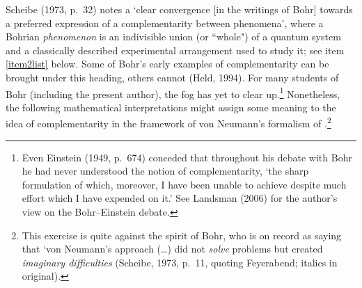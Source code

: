 \documentclass[12pt,titlepage]{article}
\begin{document}
Scheibe (1973, p.\ 32) notes a `clear convergence [in the writings of Bohr] towards a preferred expression of a complementarity between phenomena', where a Bohrian {\it phenomenon} is an indivisible union (or ``whole") of a quantum system and a classically described experimental arrangement used to study it; see item \ref{item2list} below. Some of Bohr's early examples of 
complementarity can be brought under this heading, others  cannot (Held, 1994). For many students of Bohr (including the present author), the fog has yet to clear up.\footnote{Even Einstein (1949, p.\ 674) conceded that throughout his debate with Bohr he had never understood the notion of complementarity, `the sharp formulation of which, moreover, 
 I have been unable to achieve despite much effort which I have expended on it.' See Landsman (2006) for the author's view on the Bohr--Einstein debate. }
 Nonetheless, the following mathematical interpretations might assign some meaning to the idea of complementarity in the framework of von Neumann's formalism of \qm.\footnote{This exercise is quite against the spirit of Bohr, who is on record as saying that `von Neumann's approach (\ldots) did not {\it solve} problems but created {\it imaginary difficulties} (Scheibe, 1973, p.\ 11, quoting Feyerabend; italics in original).} 
\end{document}

